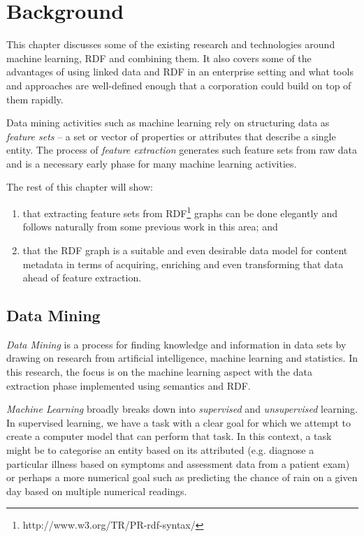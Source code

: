 \chapter{Background}

This chapter discusses some of the existing research and technologies
around machine learning, RDF and combining them. It also covers some
of the advantages of using linked data and RDF in an enterprise
setting and what tools and approaches are well-defined enough that a
corporation could build on top of them rapidly.

Data mining activities such as machine learning rely on structuring
data as \emph{feature sets}\cite{bishop2006pattern} -- a set or vector
of properties or attributes that describe a single entity.
The process of \emph{feature extraction} generates such feature sets
from raw data and is a necessary early phase for many machine learning
activities.

The rest of this chapter will show:

\begin{enumerate}
\item that extracting feature sets from
  RDF\footnote{http://www.w3.org/TR/PR-rdf-syntax/} graphs can be done
  elegantly and follows naturally from some previous work in this area; and
\item that the RDF graph is a suitable and even desirable data model for content
  metadata in terms of acquiring, enriching and even transforming that data ahead
  of feature extraction.
\end{enumerate}

\section{Data Mining}

\emph{Data Mining} is a process for finding knowledge and information
in data sets by drawing on research from artificial intelligence,
machine learning and statistics.\cite{han2011data} In this research,
the focus is on the machine learning aspect with
the data extraction phase implemented using semantics and RDF.

\emph{Machine Learning} broadly breaks down into \emph{supervised}
and \emph{unsupervised} learning. In supervised learning, we have
a task with a clear goal for which we attempt to create a computer
model that can perform that task. In this context, a task might be
to categorise an entity based on its attributed (e.g. diagnose
a particular illness based on symptoms and assessment data from a
patient exam) or perhaps a more numerical goal such as predicting
the chance of rain on a given day based on multiple numerical
readings.

